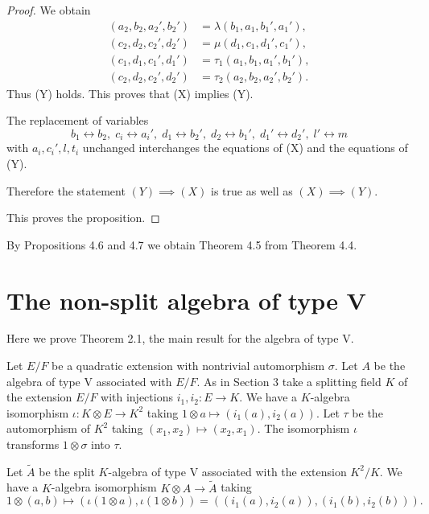 \documentclass{article}
\begin{document}
\begin{proof}
We obtain
\begin{align*}
(a_2,b_2,a_2',b_2')&=\lambda(b_1,a_1,b_1',a_1'),\\
(c_2,d_2,c_2',d_2')&=\mu(d_1,c_1,d_1',c_1'),\\
(c_1,d_1,c_1',d_1')&=\tau_1(a_1,b_1,a_1',b_1'),\\
(c_2,d_2,c_2',d_2')&=\tau_2(a_2,b_2,a_2',b_2').
\end{align*}
Thus (Y) holds.
This proves that (X) implies (Y).

The replacement of variables
$$
b_1\leftrightarrow b_2,\;
c_i\leftrightarrow a_i',\;
d_1\leftrightarrow b_2', \;
d_2\leftrightarrow b_1', \;
d_1'\leftrightarrow d_2',\;
l'\leftrightarrow m 
$$
with $a_i,c_i', l,t_i$ unchanged
interchanges  the equations of (X) and  the equations of (Y).

Therefore the statement $(Y)\implies (X)$ is true as well as $(X)\implies (Y)$.

This proves the proposition.
 
\end{proof}

By Propositions 4.6 and 4.7 we obtain Theorem 4.5 from Theorem 4.4.

\section{The non-split algebra of type V}

Here we prove Theorem 2.1, the main result for the algebra of type V.

Let $E/F$ be a quadratic extension with nontrivial automorphism $\sigma$.
Let $A$ be the algebra of type V associated with  $E/F$. 
As in Section 3 take a splitting field $K$ of the extension $E/F$ with injections $i_1,i_2\colon E\to K$.
We have a $K$-algebra isomorphism $\iota\colon K\otimes E\to K^2$ taking $1\otimes a\mapsto
(i_1(a), i_2(a))$.
Let $\tau$ be the automorphism of $K^2$ taking $(x_1,x_2)\mapsto (x_2,x_1)$.
The isomorphism $\iota$ transforms $1\otimes \sigma$ into $\tau$.

Let $\tilde A$ be the split $K$-algebra of type V associated with the extension $K^2/K$. 
We have a $K$-algebra isomorphism
$K\otimes A\to \tilde A$ taking 
$$
1\otimes (a,b) \mapsto (\iota(1\otimes a), \iota(1\otimes b))
=((i_1(a), i_2(a)), (i_1(b), i_2(b))).
$$
\end{document}
